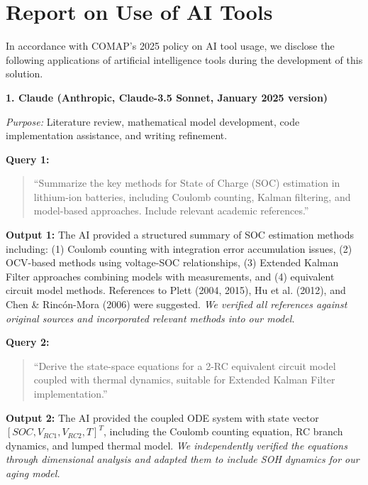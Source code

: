 
\section*{Report on Use of AI Tools}

In accordance with COMAP's 2025 policy on AI tool usage, we disclose the following applications of artificial intelligence tools during the development of this solution.

\vspace{1em}

\noindent\textbf{1. Claude (Anthropic, Claude-3.5 Sonnet, January 2025 version)}

\noindent\textit{Purpose:} Literature review, mathematical model development, code implementation assistance, and writing refinement.

\noindent\textbf{Query 1:}
\begin{quote}
``Summarize the key methods for State of Charge (SOC) estimation in lithium-ion batteries, including Coulomb counting, Kalman filtering, and model-based approaches. Include relevant academic references.''
\end{quote}

\noindent\textbf{Output 1:} The AI provided a structured summary of SOC estimation methods including: (1) Coulomb counting with integration error accumulation issues, (2) OCV-based methods using voltage-SOC relationships, (3) Extended Kalman Filter approaches combining models with measurements, and (4) equivalent circuit model methods. References to Plett (2004, 2015), Hu et al. (2012), and Chen \& Rinc\'on-Mora (2006) were suggested. \textit{We verified all references against original sources and incorporated relevant methods into our model.}

\vspace{0.5em}

\noindent\textbf{Query 2:}
\begin{quote}
``Derive the state-space equations for a 2-RC equivalent circuit model coupled with thermal dynamics, suitable for Extended Kalman Filter implementation.''
\end{quote}

\noindent\textbf{Output 2:} The AI provided the coupled ODE system with state vector $[SOC, V_{RC1}, V_{RC2}, T]^T$, including the Coulomb counting equation, RC branch dynamics, and lumped thermal model. \textit{We independently verified the equations through dimensional analysis and adapted them to include SOH dynamics for our aging model.}

